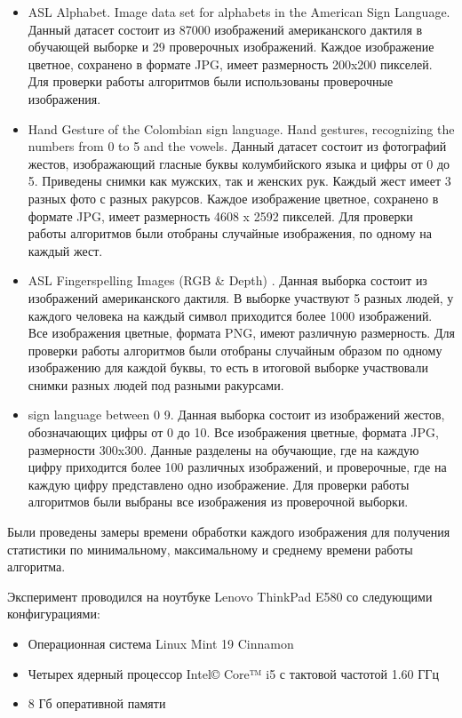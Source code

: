 \begin{itemize}
	\item ASL Alphabet. Image data set for alphabets in the American Sign Language\cite{AslAlphabet}. Данный датасет состоит из 87000 изображений американского дактиля в обучающей выборке и 29 проверочных изображений. Каждое изображение цветное, сохранено в формате JPG, имеет размерность 200x200 пикселей. Для проверки работы алгоритмов были использованы проверочные изображения.
	
	\item Hand Gesture of the Colombian sign language. Hand gestures, recognizing the numbers from 0 to 5 and the vowels\cite{Colombian}. Данный датасет состоит из фотографий жестов, изображающий гласные буквы колумбийского языка и цифры от 0 до 5. Приведены снимки как мужских, так и женских рук. Каждый жест имеет 3 разных фото с разных ракурсов. Каждое изображение цветное, сохранено в формате JPG, имеет размерность 4608 x 2592 пикселей. Для проверки работы алгоритмов были отобраны случайные изображения, по одному на каждый жест.
	
	\item ASL Fingerspelling Images (RGB \& Depth) \cite{asl2}. Данная выборка состоит из изображений американского дактиля. В выборке участвуют 5 разных людей, у каждого человека на каждый символ приходится более 1000 изображений. Все изображения цветные, формата PNG, имеют различную размерность. Для проверки работы алгоритмов были отобраны случайным образом по одному изображению для каждой буквы, то есть в итоговой выборке участвовали снимки разных людей под разными ракурсами.
	
	\item sign language between 0 9\cite{sl09}. Данная выборка состоит из изображений жестов, обозначающих цифры от 0 до 10. Все изображения цветные, формата JPG, размерности 300x300. Данные разделены на обучающие, где на каждую цифру приходится более 100 различных изображений, и проверочные, где на каждую цифру представлено одно изображение. Для проверки работы алгоритмов были выбраны все изображения из проверочной выборки. 
	
\end{itemize}

 Были проведены замеры времени обработки каждого изображения для получения статистики по минимальному, максимальному и среднему времени работы алгоритма.
 
 Эксперимент проводился на ноутбуке Lenovo ThinkPad E580 со следующими конфигурациями:
 
 \begin{itemize}
 	\item Операционная система Linux Mint 19 Cinnamon
 	\item Четырех ядерный процессор Intel© Core™ i5 с тактовой частотой 1.60 ГГц
 	\item 8 Гб оперативной памяти
 \end{itemize}